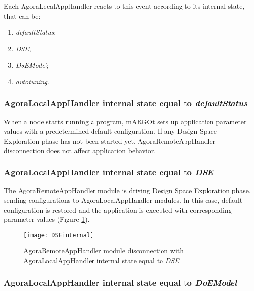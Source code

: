 Each AgoraLocalAppHandler reacts to this event according to its internal state, that can be:

\begin{enumerate}

    \item \textit{defaultStatus};
    
    \item \textit{DSE};
    
    \item \textit{DoEModel};
    
    \item \textit{autotuning}.

\end{enumerate}


\subsubsection{AgoraLocalAppHandler internal state equal to \textit{defaultStatus}}

When a node starts running a program, mARGOt sets up application parameter values with a predetermined default configuration. If any Design Space Exploration phase has not been started yet, AgoraRemoteAppHandler disconnection does not affect application behavior.


\subsubsection{AgoraLocalAppHandler internal state equal to \textit{DSE}}

The AgoraRemoteAppHandler module is driving Design Space Exploration phase, sending configurations to AgoraLocalAppHandler modules. In this case, default configuration is restored and the application is executed with corresponding parameter values (Figure \ref{fig::remDiscDSE}).

\begin{figure}[htb]

    \centering
    \texttt{[image: DSEinternal]}

    \caption{AgoraRemoteAppHandler module disconnection with A\-go\-ra\-Local\-App\-Handler internal state equal to \textit{DSE}}

    \label{fig::remDiscDSE}
    
\end{figure}


\subsubsection{AgoraLocalAppHandler internal state equal to \textit{DoEModel}}

